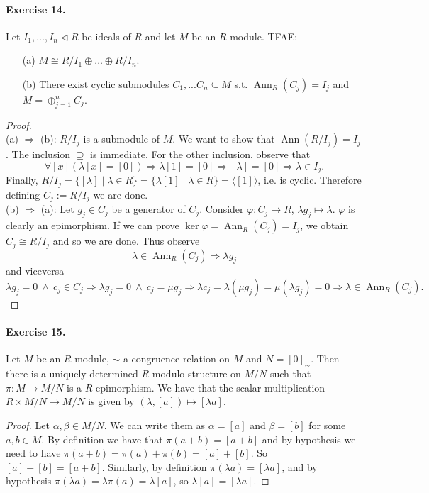 \documentclass[12pt,a4paper]{report}
\theoremstyle{definition}
\theoremstyle{num.custom-title}
\DeclareMathOperator{\Ann}{Ann}
\DeclareMathOperator{\imp}{\Rightarrow}
\DeclareMathOperator{\sse}{\subseteq}
\renewcommand{\phi}{\varphi}
\begin{document}
\paragraph{Exercise 14.} Let $I_1,...,I_n \lhd R$ be ideals of $R$ and let $M$ be an $R$-module. TFAE:
\begin{itemize}
\item[(a)] $M \cong R/I_1 \oplus ... \oplus R/I_n$.
\item[(b)] There exist cyclic submodules $C_1,...C_n \sse M$ s.t. $\Ann_R(C_j)=I_j$ and $M=\oplus_{j=1}^n C_j$.
\end{itemize}
\begin{proof}\ \\
(a) $\imp$ (b): $R/I_j$ is a submodule of $M$. We want to show that $\Ann(R/I_j)=I_j$. The inclusion $\supseteq$ is immediate. For the other inclusion, observe that 
\[
\forall [x] (\lambda [x] = [0]) \imp \lambda [1] = [0] \imp [\lambda] = [0] \imp \lambda \in I_j.
\]
Finally, $R/I_j= \{[\lambda] \mid \lambda \in R\}= \{\lambda[1] \mid \lambda \in R\}=\langle [1] \rangle$, i.e. is cyclic. Therefore defining $C_j:=R/I_j$ we are done.\\
(b) $\imp$ (a): Let $g_j \in C_j$ be a generator of $C_j$. Consider $\phi: C_j \to R$, $\lambda g_j \mapsto \lambda$. $\phi$ is clearly an epimorphism. If we can prove $\ker \phi = \Ann_R(C_j)=I_j$, we obtain $C_j \cong R/I_j$ and so we are done. Thus observe
\[
\lambda \in \Ann_R(C_j) \imp \lambda g_j
\]
and viceversa
\[
\lambda g_j =0 \ \wedge \ c_j \in C_j \imp \lambda g_j=0 \ \wedge \ c_j=\mu g_j \imp \lambda c_j = \lambda (\mu g_j) = \mu (\lambda g_j)=0 \imp \lambda \in \Ann_R(C_j).
\]
\end{proof}

\paragraph{Exercise 15.} Let $M$ be an $R$-module, $\sim$ a congruence relation on $M$ and $N=[0]_\sim$. Then there is a uniquely determined $R$-modulo structure on $M/N$ such that $\pi: M \to M/N$ is a $R$-epimorphism. We have that the scalar multiplication $R \times M/N \to M/N$ is given by $(\lambda, [a]) \mapsto [\lambda a]$.
\begin{proof}
Let $\alpha, \beta \in M/N$. We can write them as $\alpha=[a]$ and $\beta=[b]$ for some $a,b \in M$. By definition we have that $\pi(a+b)=[a+b]$ and by hypothesis we need to have $\pi(a+b)=\pi(a)+\pi(b)=[a]+[b]$. So $[a]+[b]=[a+b]$. Similarly, by definition $\pi(\lambda a)=[\lambda a]$, and by hypothesis $\pi(\lambda a)=\lambda \pi(a) = \lambda [a]$, so $\lambda [a] = [\lambda a]$.
\end{proof}
\end{document}
